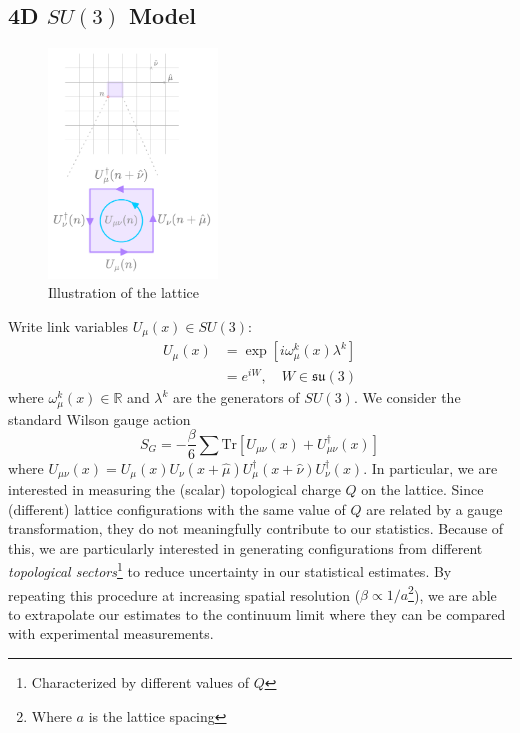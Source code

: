 \documentclass[a4paper,11pt]{article}
\begin{document}
\subsection{\label{subsec:4dSU3}4D \texorpdfstring{$SU(3)$}{SU(3)} Model}
%
\begin{figure}
  \begin{center}
    \includegraphics[width=0.4\textwidth]{assets/lattice}
  \end{center}
  \caption{Illustration of the lattice}
  \label{fig:lattice}
\end{figure}
%
Write link variables $U_{\mu}(x) \in SU(3)$:
%
\begin{align}
U_{\mu}(x) &= \exp\left[i \omega_{\mu}^{k}(x) \lambda^{k} \right] \\
&= e^{iW}, \quad W \in \mathfrak{su}(3)
\end{align}
%
where $\omega_{\mu}^{k}(x) \in \mathbb{R}$ and $\lambda^{k}$ are the generators of $SU(3)$.
%
We consider the standard Wilson gauge action
%
\begin{equation}
S_{G} = -\frac{\beta}{6}\sum \mathrm{Tr}\left[U_{\mu\nu}(x) + U^{\dagger}_{\mu\nu}(x) \right]
\end{equation}
%
where $U_{\mu\nu}(x) = U_{\mu}(x) U_{\nu}(x + \hat{\mu}) U_{\mu}^{\dagger}(x + \hat{\nu}) U^{\dagger}_{\nu}(x)$.
%
In particular, we are interested in measuring the (scalar) topological charge $Q$ on the lattice.
%
Since (different) lattice configurations with the same value of $Q$ are related by a gauge transformation, they do not meaningfully contribute to our statistics.
%
Because of this, we are particularly interested in generating configurations from different \textit{topological sectors}\footnote{Characterized by different values of $Q$} to reduce uncertainty in our statistical estimates.
%
By repeating this procedure at increasing spatial resolution ($\beta \propto 1 / a$\footnote{Where $a$ is the lattice spacing}), we are able to extrapolate our estimates to the continuum limit where they can be compared with experimental measurements.
\end{document}
